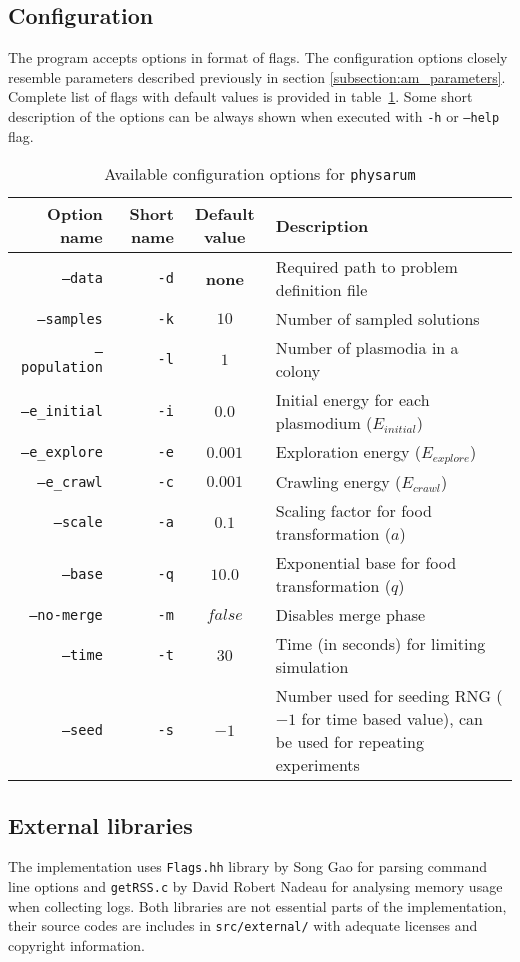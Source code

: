 \subsection{Configuration}

The program accepts options in format of flags. The configuration options closely resemble parameters described previously in section \ref{subsection:am_parameters}. Complete list of flags with default values is provided in table~\ref{table:pi_options}. Some short description of the options can be always shown when executed with \texttt{-h} or \texttt{--help} flag.

\begin{table}[h]
  \centering
  \caption{Available configuration options for \texttt{physarum}}
  \label{table:pi_options}
  \begin{tabularx}{\textwidth}{r|r|c|X}
    Option name & Short name & Default value & Description \\ \hline \hline
    \texttt{--data} & \texttt{-d} & \textbf{none} & Required path to problem definition file \\ \hline
    \texttt{--samples} & \texttt{-k} & $10$ & Number of sampled solutions \\ \hline
    \texttt{--population} & \texttt{-l} & $1$ & Number of plasmodia in a colony \\ \hline
    \texttt{--e\_initial} & \texttt{-i} & $0.0$ & Initial energy for each plasmodium ($E_{initial}$) \\ \hline
    \texttt{--e\_explore} & \texttt{-e} & $0.001$ & Exploration energy ($E_{explore}$) \\ \hline
    \texttt{--e\_crawl} & \texttt{-c} & $0.001$ & Crawling energy ($E_{crawl}$) \\ \hline
    \texttt{--scale} & \texttt{-a} & $0.1$ & Scaling factor for food transformation ($a$) \\ \hline
    \texttt{--base} & \texttt{-q} & $10.0$ & Exponential base for food transformation ($q$) \\ \hline
    \texttt{--no-merge} & \texttt{-m} & $false$ & Disables merge phase \\ \hline
    \texttt{--time} & \texttt{-t} & $30$ & Time (in seconds) for limiting simulation \\ \hline
    \texttt{--seed} & \texttt{-s} & $-1$ & Number used for seeding RNG ($-1$ for time based value), can be used for repeating experiments \\ \hline \hline
  \end{tabularx}
\end{table}

\subsection{External libraries}

The implementation uses \texttt{Flags.hh} library by Song Gao for parsing command line options and \texttt{getRSS.c} by David Robert Nadeau for analysing memory usage when collecting logs. Both libraries are not essential parts of the implementation, their source codes are includes in \texttt{src/external/} with adequate licenses and copyright information. 

